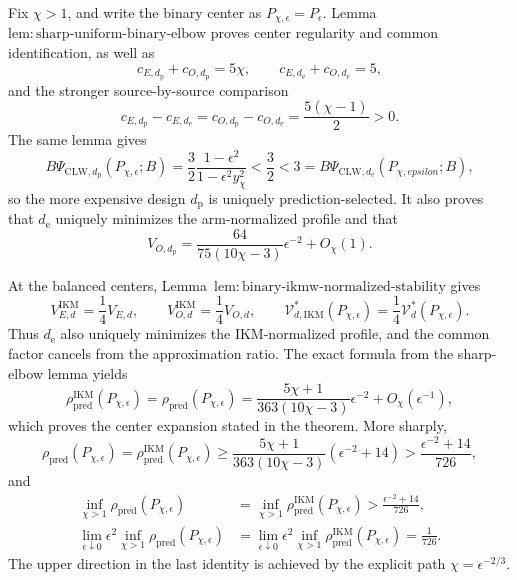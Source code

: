 Fix \(\chi>1\), and write the binary center as \(P_{\chi,\epsilon}=P_\epsilon\). Lemma~\(\mathrm{lem{:}sharp\text{-}uniform\text{-}binary\text{-}elbow}\) proves center regularity and common identification, as well as
\[
 c_{E,d_{\mathrm p}}+c_{O,d_{\mathrm p}}=5\chi,
 \qquad
 c_{E,d_{\mathrm e}}+c_{O,d_{\mathrm e}}=5,
\]
and the stronger source-by-source comparison
\[
 c_{E,d_{\mathrm p}}-c_{E,d_{\mathrm e}}
 =c_{O,d_{\mathrm p}}-c_{O,d_{\mathrm e}}
 =\frac{5(\chi-1)}2>0.                                \tag{1}
\]
The same lemma gives
\[
 B\Psi_{\mathrm{CLW},d_{\mathrm p}}(P_{\chi,\epsilon};B)
 =\frac32\frac{1-\epsilon^2}{1-\epsilon^2y_\chi^2}
 <\frac32<3
 =B\Psi_{\mathrm{CLW},d_{\mathrm e}}(P_{\chi,epsilon};B), \tag{2}
\]
so the more expensive design \(d_{\mathrm p}\) is uniquely prediction-selected. It also proves that \(d_{\mathrm e}\) uniquely minimizes the arm-normalized profile and that
\[
 V_{O,d_{\mathrm p}}
 =\frac{64}{75(10\chi-3)}\epsilon^{-2}+O_\chi(1).      \tag{3}
\]

At the balanced centers, Lemma~\(\mathrm{lem{:}binary\text{-}ikmw\text{-}normalized\text{-}stability}\) gives
\[
 V_{E,d}^{\mathrm{IKM}}=\frac14V_{E,d},
 \qquad
 V_{O,d}^{\mathrm{IKM}}=\frac14V_{O,d},
 \qquad
 \mathcal V_{d,\mathrm{IKM}}^*(P_{\chi,\epsilon})
 =\frac14\mathcal V_d^*(P_{\chi,\epsilon}).           \tag{4}
\]
Thus \(d_{\mathrm e}\) also uniquely minimizes the IKM-normalized profile, and the common factor cancels from the approximation ratio. The exact formula from the sharp-elbow lemma yields
\[
 \rho_{\mathrm{pred}}^{\mathrm{IKM}}(P_{\chi,\epsilon})
 =\rho_{\mathrm{pred}}(P_{\chi,\epsilon})
 =\frac{5\chi+1}{363(10\chi-3)}\epsilon^{-2}
 +O_\chi(\epsilon^{-1}),                              \tag{5}
\]
which proves the center expansion stated in the theorem. More sharply,
\[
 \rho_{\mathrm{pred}}(P_{\chi,\epsilon})
 =\rho_{\mathrm{pred}}^{\mathrm{IKM}}(P_{\chi,\epsilon})
 \ge\frac{5\chi+1}{363(10\chi-3)}(\epsilon^{-2}+14)
 >\frac{\epsilon^{-2}+14}{726},                       \tag{6}
\]
and
\[
\begin{aligned}
 \inf_{\chi>1}\rho_{\mathrm{pred}}(P_{\chi,\epsilon})
 &=\inf_{\chi>1}\rho_{\mathrm{pred}}^{\mathrm{IKM}}(P_{\chi,\epsilon})
 >\frac{\epsilon^{-2}+14}{726},\\
 \lim_{\epsilon\downarrow0}\epsilon^2
 \inf_{\chi>1}\rho_{\mathrm{pred}}(P_{\chi,\epsilon})
 &=\lim_{\epsilon\downarrow0}\epsilon^2
 \inf_{\chi>1}\rho_{\mathrm{pred}}^{\mathrm{IKM}}(P_{\chi,\epsilon})
 =\frac1{726}.
                                                               \tag{7}
\end{aligned}
\]
The upper direction in the last identity is achieved by the explicit path \(\chi=\epsilon^{-2/3}\).

